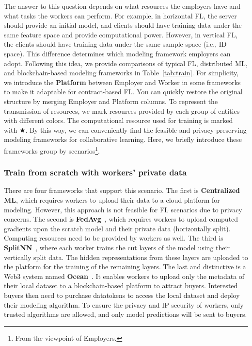 The answer to this question depends on what resources the employers have and what tasks the workers can perform.
For example, in horizontal FL, the server should provide an initial model, and clients should have training data under the same feature space and provide computational power. However, in vertical FL, the clients should have training data under the same sample space (i.e., ID space). 
This difference determines which modeling framework employers can adopt. 
Following this idea, we provide comparisons of typical FL, distributed ML, and blockchain-based modeling frameworks in Table~\ref{tab:train}.
For simplicity, we introduce the \textbf{Platform} between Employer and Worker in some frameworks to make it adaptable for contract-based FL. 
You can quickly restore the original structure by merging Employer and Platform columns.
To represent the transmission of resources, we mark resources provided by each group of entities with different colors.
The computational resource used for training is marked with $\bigstar$.
By this way, we can conveniently find the feasible and privacy-preserving modeling frameworks for collaborative learning. 
Here, we briefly introduce these frameworks group by scenarios\footnote{From the viewpoint of Employers.}.

\subsubsection{Train from scratch with workers' private data}
There are four frameworks that support this scenario. 
The first is \textbf{Centralized ML}, which requires workers to upload their data to a cloud platform for modeling. However, this approach is not feasible for FL scenarios due to privacy concerns. 
The second is \textbf{FedAvg}~\cite{mcmahan2017communication}, which requires workers to upload computed gradients upon the scratch model and their private data (horizontally split). Computing resources need to be provided by workers as well.
The third is \textbf{SplitNN}~\cite{vepakomma2019split}, where each worker trains the cut layers of the model using their vertically split data. 
The hidden representations from these layers are uploaded to the platform for the training of the remaining layers.
The last and distinctive is a Web3 system named \textbf{Ocean}~\cite{mcconaghy2022ocean}.
It enables workers to upload only the metadata of their local dataset to a blockchain-based platform to attract buyers. 
Interested buyers then need to purchase datatokens to access the local dataset and deploy their modeling algorithm. 
To ensure the privacy and IP security of workers, only trusted algorithms are allowed, and only model predictions will be sent to buyers.

